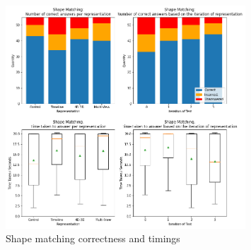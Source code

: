 \documentclass{l4proj}
\begin{document}
\begin{figure}
  \centering
  \includegraphics[width=0.8\textwidth]{images/results/shape_matching_stats.png}
  \caption{Shape matching correctness and timings}
  \label{fig:shape_stats}
\end{figure}
\end{document}
